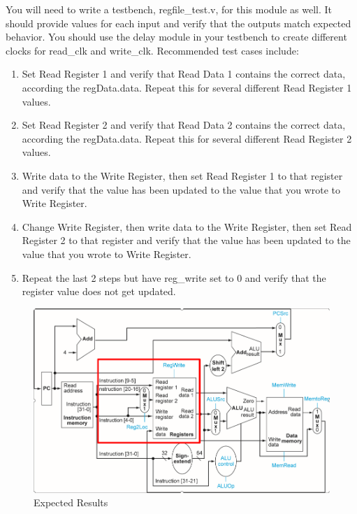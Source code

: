 You will need to write a testbench, regfile\_test.v, for this module as well.  It should provide values for each input and verify that the outputs match expected behavior.  You should use the delay module in your testbench to create different clocks for read\_clk and write\_clk.  Recommended test cases include:

\begin{enumerate}
	\item Set Read Register 1 and verify that Read Data 1 contains the correct data, according the regData.data.  Repeat this for several different Read Register 1 values.
	\item Set Read Register 2 and verify that Read Data 2 contains the correct data, according the regData.data.  Repeat this for several different Read Register 2 values.
	\item Write data to the Write Register, then set Read Register 1 to that register and verify that the value has been updated to the value that you wrote to Write Register.
	\item Change Write Register, then write data to the Write Register, then set Read Register 2 to that register and verify that the value has been updated to the value that you wrote to Write Register.
	\item Repeat the last 2 steps but have reg\_write set to 0 and verify that the register value does not get updated.
\end{enumerate} 

\begin{figure}
	\caption{Expected Results}\label{fig:register_file_cutout}
	\begin{center}
		\includegraphics[width=4.75in]{../images/register_file_cutout.png}
	\end{center}
\end{figure} 


